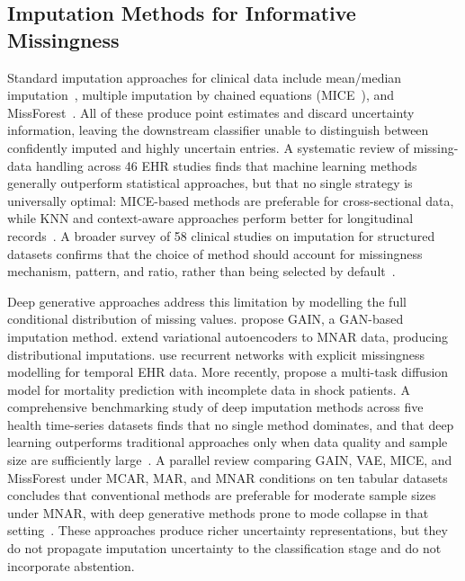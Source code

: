 \documentclass[a4paper,fleqn,longmktitle]{cas-sc}
\begin{document}
	\subsection{Imputation Methods for Informative Missingness}
	\label{sec:rw_imputation}
	
	Standard imputation approaches for clinical data include mean/median
	imputation~\citep{sterne2009multiple}, multiple imputation by chained
	equations (MICE~\citep{van2011mice}), and
	MissForest~\citep{stekhoven2012missforest}.
	All of these produce point estimates and discard uncertainty
	information, leaving the downstream classifier unable to distinguish
	between confidently imputed and highly uncertain entries.
	A systematic review of missing-data handling across 46 EHR studies
	finds that machine learning methods generally outperform statistical
	approaches, but that no single strategy is universally optimal:
	MICE-based methods are preferable for cross-sectional data, while
	KNN and context-aware approaches perform better for longitudinal
	records~\citep{ren2024moving}.
	A broader survey of 58 clinical studies on imputation for structured
	datasets confirms that the choice of method should account for
	missingness mechanism, pattern, and ratio, rather than being
	selected by default~\citep{afkanpour2024systematic}.
	
	Deep generative approaches address this limitation by modelling
	the full conditional distribution of missing values.
	\citet{yoon2018gain} propose GAIN, a GAN-based imputation method.
	\citet{ipsen2020not} extend variational autoencoders to MNAR data,
	producing distributional imputations.
	\citet{ma2020mimic} use recurrent networks with explicit missingness
	modelling for temporal EHR data.
	More recently, \citet{zhao2024multitask} propose a multi-task
	diffusion model for mortality prediction with incomplete data in
	shock patients.
	A comprehensive benchmarking study of deep imputation methods
	across five health time-series datasets finds that no single method
	dominates, and that deep learning outperforms traditional approaches
	only when data quality and sample size are sufficiently
	large~\citep{kazijevs2023deep}.
	A parallel review comparing GAIN, VAE, MICE, and MissForest under
	MCAR, MAR, and MNAR conditions on ten tabular datasets concludes
	that conventional methods are preferable for moderate sample sizes
	under MNAR, with deep generative methods prone to mode collapse
	in that setting~\citep{sun2023deeplearning}.
	These approaches produce richer uncertainty representations, but
	they do not propagate imputation uncertainty to the classification
	stage and do not incorporate abstention.
	
\end{document}
